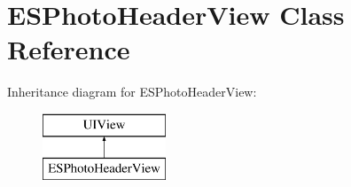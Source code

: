 \hypertarget{interface_e_s_photo_header_view}{}\section{E\+S\+Photo\+Header\+View Class Reference}
\label{interface_e_s_photo_header_view}
Inheritance diagram for E\+S\+Photo\+Header\+View\+:\begin{figure}[H]
\begin{center}
\leavevmode
\includegraphics[height=2.000000cm]{interface_e_s_photo_header_view}
\end{center}
\end{figure}

